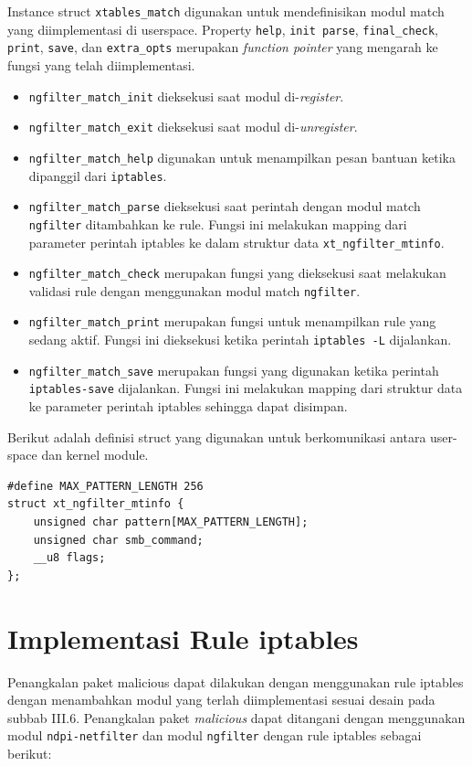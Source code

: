 Instance struct \verb|xtables_match| digunakan untuk mendefinisikan modul match yang diimplementasi di userspace.
Property \verb|help|, \verb|init parse|, \verb|final_check|, \verb|print|, \verb|save|, dan \verb|extra_opts| merupakan \textit{function pointer} yang mengarah ke fungsi yang telah diimplementasi.

\begin{itemize}
\item \verb|ngfilter_match_init| dieksekusi saat modul di-\textit{register}.
\item \verb|ngfilter_match_exit| dieksekusi saat modul di-\textit{unregister}.
\item \verb|ngfilter_match_help| digunakan untuk menampilkan pesan bantuan ketika dipanggil dari \verb|iptables|.
\item \verb|ngfilter_match_parse| dieksekusi saat perintah dengan modul match \verb|ngfilter| ditambahkan ke rule. Fungsi ini melakukan mapping dari parameter perintah iptables ke dalam struktur data \verb|xt_ngfilter_mtinfo|.
\item \verb|ngfilter_match_check| merupakan fungsi yang dieksekusi saat melakukan validasi rule dengan menggunakan modul match \verb|ngfilter|.
\item \verb|ngfilter_match_print| merupakan fungsi untuk menampilkan rule yang sedang aktif. Fungsi ini dieksekusi ketika perintah \verb|iptables -L| dijalankan.
\item \verb|ngfilter_match_save| merupakan fungsi yang digunakan ketika perintah \verb|iptables-save| dijalankan. Fungsi ini melakukan mapping dari struktur data ke parameter perintah iptables sehingga dapat disimpan.
\end{itemize}

Berikut adalah definisi struct yang digunakan untuk berkomunikasi antara user-space dan kernel module.

\begin{lstlisting}
#define MAX_PATTERN_LENGTH 256
struct xt_ngfilter_mtinfo {
	unsigned char pattern[MAX_PATTERN_LENGTH];
	unsigned char smb_command;
	__u8 flags;
};
\end{lstlisting}

\section{Implementasi Rule iptables}

Penangkalan paket malicious dapat dilakukan dengan menggunakan rule iptables dengan menambahkan modul yang terlah diimplementasi sesuai desain pada subbab III.6. Penangkalan paket \textit{malicious} dapat ditangani dengan menggunakan modul \verb|ndpi-netfilter| dan modul \verb|ngfilter| dengan rule iptables sebagai berikut:

